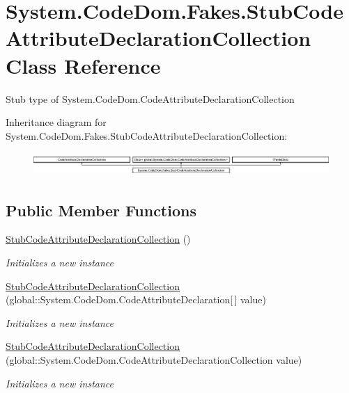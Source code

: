 \hypertarget{class_system_1_1_code_dom_1_1_fakes_1_1_stub_code_attribute_declaration_collection}{\section{System.\-Code\-Dom.\-Fakes.\-Stub\-Code\-Attribute\-Declaration\-Collection Class Reference}
\label{class_system_1_1_code_dom_1_1_fakes_1_1_stub_code_attribute_declaration_collection}
}


Stub type of System.\-Code\-Dom.\-Code\-Attribute\-Declaration\-Collection 


Inheritance diagram for System.\-Code\-Dom.\-Fakes.\-Stub\-Code\-Attribute\-Declaration\-Collection\-:\begin{figure}[H]
\begin{center}
\leavevmode
\includegraphics[height=0.908354cm]{class_system_1_1_code_dom_1_1_fakes_1_1_stub_code_attribute_declaration_collection}
\end{center}
\end{figure}
\subsection*{Public Member Functions}
\begin{DoxyCompactItemize}
\item 
\hyperlink{class_system_1_1_code_dom_1_1_fakes_1_1_stub_code_attribute_declaration_collection_a5bf65d53b3150c212bd17b9a04202dfc}{Stub\-Code\-Attribute\-Declaration\-Collection} ()
\begin{DoxyCompactList}\small\item\em Initializes a new instance\end{DoxyCompactList}\item 
\hyperlink{class_system_1_1_code_dom_1_1_fakes_1_1_stub_code_attribute_declaration_collection_a9693b2008991072e9b8fc37493da5bc6}{Stub\-Code\-Attribute\-Declaration\-Collection} (global\-::\-System.\-Code\-Dom.\-Code\-Attribute\-Declaration\mbox{[}$\,$\mbox{]} value)
\begin{DoxyCompactList}\small\item\em Initializes a new instance\end{DoxyCompactList}\item 
\hyperlink{class_system_1_1_code_dom_1_1_fakes_1_1_stub_code_attribute_declaration_collection_abdac1a0c9c385660dd33c2c894bb0b1f}{Stub\-Code\-Attribute\-Declaration\-Collection} (global\-::\-System.\-Code\-Dom.\-Code\-Attribute\-Declaration\-Collection value)
\begin{DoxyCompactList}\small\item\em Initializes a new instance\end{DoxyCompactList}\end{DoxyCompactItemize}
